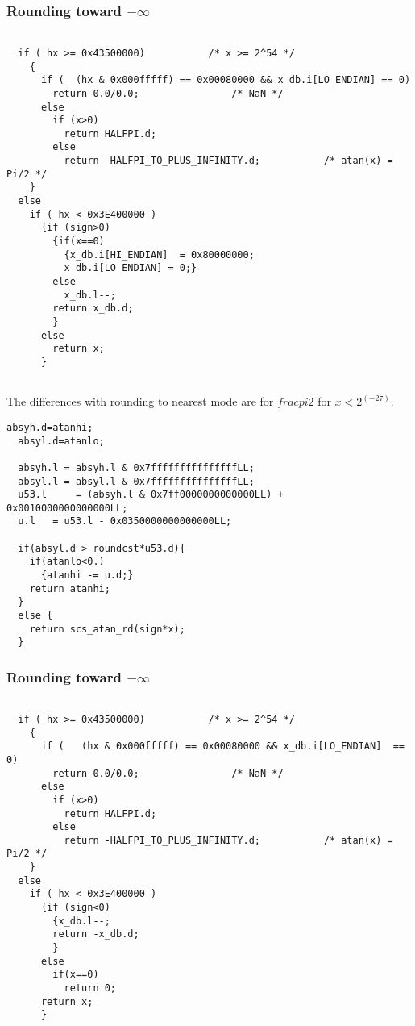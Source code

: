 \subsubsection{Rounding toward $-\infty$}
\begin{lstlisting}[caption={Exceptional cases : rounding down},firstnumber=1]

  if ( hx >= 0x43500000)           /* x >= 2^54 */
    {
      if (  (hx & 0x000fffff) == 0x00080000 && x_db.i[LO_ENDIAN] == 0)
        return 0.0/0.0;                /* NaN */
      else
        if (x>0)
          return HALFPI.d;
        else
          return -HALFPI_TO_PLUS_INFINITY.d;           /* atan(x) = Pi/2 */
    }
  else
    if ( hx < 0x3E400000 )
      {if (sign>0)
        {if(x==0)
          {x_db.i[HI_ENDIAN]  = 0x80000000;
          x_db.i[LO_ENDIAN] = 0;}
        else
          x_db.l--;
        return x_db.d;
        }
      else
        return x;
      }
  
\end{lstlisting}

The differences with rounding to nearest mode are for $frac{pi}{2}$ for
$x<2^(-27)$.

\begin{lstlisting}[caption={Test for rounding down},firstnumber=1]
  absyh.d=atanhi;
  absyl.d=atanlo;
  
  absyh.l = absyh.l & 0x7fffffffffffffffLL;
  absyl.l = absyl.l & 0x7fffffffffffffffLL;
  u53.l     = (absyh.l & 0x7ff0000000000000LL) +  0x0010000000000000LL;
  u.l   = u53.l - 0x0350000000000000LL;
  
  if(absyl.d > roundcst*u53.d){
    if(atanlo<0.)
      {atanhi -= u.d;}
    return atanhi;
  }
  else {
    return scs_atan_rd(sign*x);
  }
\end{lstlisting}

\subsubsection{Rounding toward $-\infty$}

\begin{lstlisting}[caption={Exceptional cases : rounding up},firstnumber=1]

  if ( hx >= 0x43500000)           /* x >= 2^54 */
    {
      if (   (hx & 0x000fffff) == 0x00080000 && x_db.i[LO_ENDIAN]  == 0)
        return 0.0/0.0;                /* NaN */
      else
        if (x>0)
          return HALFPI.d;
        else
          return -HALFPI_TO_PLUS_INFINITY.d;           /* atan(x) = Pi/2 */
    }
  else
    if ( hx < 0x3E400000 )
      {if (sign<0)
        {x_db.l--;
        return -x_db.d;
        }
      else
        if(x==0)
          return 0;
      return x;
      }

\end{lstlisting}

